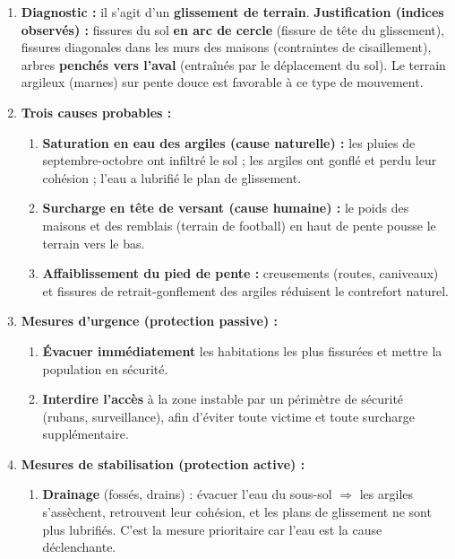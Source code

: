 \documentclass[11pt]{article}
\begin{document}
\begin{corrige}
\tcblower
\begin{enumerate}
\item \textbf{Diagnostic :} il s'agit d'un \textbf{glissement de terrain}. \textbf{Justification (indices observés) :} fissures du sol \textbf{en arc de cercle} (fissure de tête du glissement), fissures diagonales dans les murs des maisons (contraintes de cisaillement), arbres \textbf{penchés vers l'aval} (entraînés par le déplacement du sol). Le terrain argileux (marnes) sur pente douce est favorable à ce type de mouvement.
\item \textbf{Trois causes probables :}
      \begin{enumerate}
      \item \textbf{Saturation en eau des argiles (cause naturelle) :} les pluies de septembre-octobre ont infiltré le sol ; les argiles ont gonflé et perdu leur cohésion ; l'eau a lubrifié le plan de glissement.
      \item \textbf{Surcharge en tête de versant (cause humaine) :} le poids des maisons et des remblais (terrain de football) en haut de pente pousse le terrain vers le bas.
      \item \textbf{Affaiblissement du pied de pente :} creusements (routes, caniveaux) et fissures de retrait-gonflement des argiles réduisent le contrefort naturel.
      \end{enumerate}
\item \textbf{Mesures d'urgence (protection passive) :}
      \begin{enumerate}
      \item \textbf{Évacuer immédiatement} les habitations les plus fissurées et mettre la population en sécurité.
      \item \textbf{Interdire l'accès} à la zone instable par un périmètre de sécurité (rubans, surveillance), afin d'éviter toute victime et toute surcharge supplémentaire.
      \end{enumerate}
\item \textbf{Mesures de stabilisation (protection active) :}
      \begin{enumerate}
      \item \textbf{Drainage} (fossés, drains) : évacuer l'eau du sous-sol $\Rightarrow$ les argiles s'assèchent, retrouvent leur cohésion, et les plans de glissement ne sont plus lubrifiés. C'est la mesure prioritaire car l'eau est la cause déclenchante.

\end{enumerate}
\end{enumerate}
\end{corrige}
\end{document}
